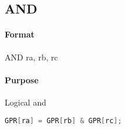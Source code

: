\subsection{AND}


\paragraph{Format} AND ra, rb, rc

\paragraph{Purpose} Logical and
\begin{lstlisting}[language=c]
    GPR[ra] = GPR[rb] & GPR[rc];
\end{lstlisting}
